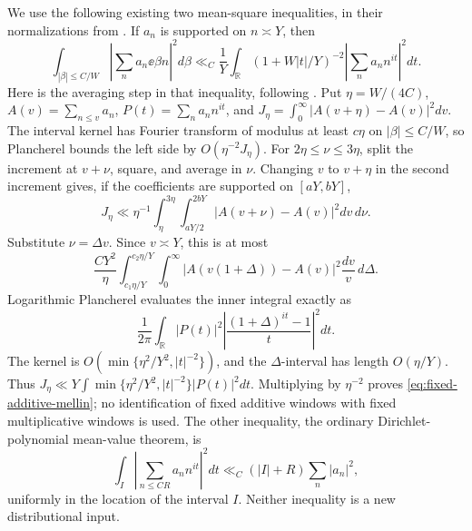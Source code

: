 We use the following existing two mean-square inequalities, in their
normalizations from \cite[Lemma 6.3 and (6.14)]{walsh}. If \(a_n\)
is supported on \(n\asymp Y\), then
\begin{equation}\label{eq:fixed-additive-mellin}
 \int_{|\beta|\le C/W}\left|\sum_na_n\ee{\beta n}\right|^2d\beta
 \ll_C\frac1Y\int_{\mathbb R}(1+W|t|/Y)^{-2}
                         \left|\sum_na_nn^{it}\right|^2dt.
\end{equation}
Here is the averaging step in that inequality, following
\cite[Lemmas 2.1--2.2]{soundararajan}. Put
\(\eta=W/(4C)\), \(A(v)=\sum_{n\le v}a_n\),
\(P(t)=\sum_na_nn^{it}\), and
\(J_\eta=\int_0^\infty|A(v+\eta)-A(v)|^2dv\).
The interval kernel has Fourier transform of modulus at least
\(c\eta\) on \(|\beta|\le C/W\), so Plancherel bounds the
left side by \(O(\eta^{-2}J_\eta)\).
For \(2\eta\le\nu\le3\eta\), split the increment at \(v+\nu\),
square, and average in \(\nu\). Changing \(v\) to \(v+\eta\)
in the second increment gives, if the coefficients are supported
on \([aY,bY]\),
\[
 J_\eta\ll\eta^{-1}\int_\eta^{3\eta}
       \int_{aY/2}^{2bY}|A(v+\nu)-A(v)|^2dv\,d\nu.
\]
Substitute \(\nu=\Delta v\). Since \(v\asymp Y\), this is at most
\[
 \frac{CY^2}{\eta}
 \int_{c_1\eta/Y}^{c_2\eta/Y}\int_0^\infty
       |A(v(1+\Delta))-A(v)|^2\frac{dv}{v}\,d\Delta.
\]
Logarithmic Plancherel evaluates the inner integral exactly as
\[
 \frac1{2\pi}\int_{\mathbb R}|P(t)|^2
          \left|\frac{(1+\Delta)^{it}-1}{t}\right|^2dt.
\]
The kernel is \(O(\min\{\eta^2/Y^2,|t|^{-2}\})\), and
the \(\Delta\)-interval has length \(O(\eta/Y)\). Thus
\(J_\eta\ll Y\int\min\{\eta^2/Y^2,|t|^{-2}\}|P(t)|^2dt\).
Multiplying by \(\eta^{-2}\) proves
\eqref{eq:fixed-additive-mellin}; no identification of fixed additive
windows with fixed multiplicative windows is used. The other inequality,
the ordinary Dirichlet-polynomial mean-value theorem, is
\begin{equation}\label{eq:fixed-dirichlet-mean}
 \int_I\left|\sum_{n\le CR}a_nn^{it}\right|^2dt
              \ll_C (|I|+R)\sum_n|a_n|^2,
\end{equation}
uniformly in the location of the interval \(I\). Neither inequality
is a new distributional input.

